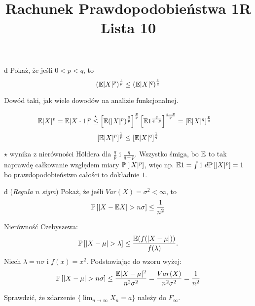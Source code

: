 \documentclass{article}
\title{Rachunek Prawdopodobieństwa 1R\\{\normalsize Lista 10}}
\author{}
\date{}
\begin{document}
\maketitle\thispagestyle{empty}

\begin{problem}{d}
  Pokaż, że jeśli $0<p<q$, to
  $$\left(\mathbb{E}|X|^p\right)^\frac{1}{p}\leq\left(\mathbb{E}|X|^q\right)^\frac{1}{q}$$
\end{problem}

  Dowód taki, jak wiele dowodów na analizie funkcjonalnej.

\begin{align*}
  \mathbb{E}|X|^p&=\mathbb{E}|X\cdot 1|^p\overset{\star}{\leq} \left[\mathbb{E}(|X|^p)^\frac{q}{p}\right]^\frac{p}{q}\left[\mathbb{E}1^{\frac{q}{q-p}}\right]^\frac{q-p}{q}=\left[\mathbb{E}|X|^q\right]^\frac{p}{q}
\end{align*}
  $$\left[\mathbb{E}|X|^p\right]^\frac{1}{p}\leq \left[\mathbb{E}|X|^q\right]^\frac{1}{q}$$

  $\star$ wynika z nierówności H\"oldera dla $\frac{q}{p}$ i $\frac{q}{q-p}$. Wszystko śmiga, bo $\mathbb{E}$ to tak naprawdę całkowanie względem miary $\prob{|X|^p}$, więc np. $\e1=\int 1\;d\prob{|X|^p}=1$ bo prawdopodobieństwo całości to dokładnie $1$.

\begin{problem}{d}
  (\emph{Reguła $n$ sigm}) Pokaż, że jeśli $Var(X)=\sigma^2<\infty$, to
  $$\prob{|X-\e X|>n\sigma}\leq\frac{1}{n^2}$$
\end{problem}

Nierówność Czebyszewa:
$$\prob{|X-\mu|>\lambda}\leq\frac{\e(f(|X-\mu|))}{f(\lambda)}.$$
Niech $\lambda=n\sigma$ i $f(x)=x^2$. Podstawiając do wzoru wyżej:
$$\prob{|X-\mu|>n\sigma}\leq\frac{\e|X-\mu|^2}{n^2\sigma^2}=\frac{Var(X)}{n^2\sigma^2}=\frac{1}{n^2}$$

\begin{problem}{}
  Sprawdzić, że zdarzenie $\{\lim_{n\to\infty}X_n=a\}$ należy do $F_\infty$.
\end{problem}

\newpage
\begin{illustration}
  \kaczka 
\end{illustration}
 
\end{document}
